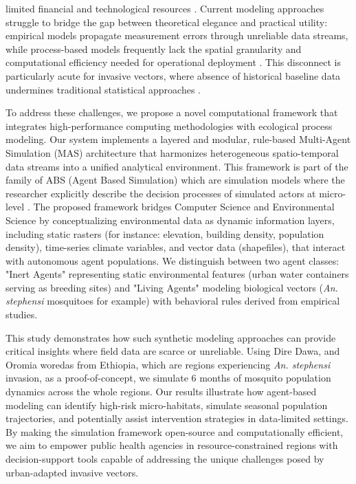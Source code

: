 \documentclass{article}
\begin{document}
limited financial and technological resources \citep{2025.RL.HMD}. Current modeling approaches struggle to bridge the gap between 
theoretical elegance and practical utility: empirical models propagate measurement errors through unreliable data streams, while 
process-based models frequently lack the spatial granularity and computational efficiency needed for operational 
deployment \citep{2025.RL.HMD}. This disconnect is particularly acute for invasive vectors, where absence of historical 
baseline data undermines traditional statistical approaches \citep{2019.EL.ALO}.
\par
To address these challenges, we propose a novel computational framework that integrates high-performance computing methodologies 
with ecological process modeling. Our system implements a layered and modular, rule-based Multi-Agent Simulation (MAS) architecture that 
harmonizes heterogeneous spatio-temporal data streams into a unified analytical environment. This framework is part of the 
family of ABS (Agent Based Simulation) which are simulation models where the researcher explicitly describe the decision 
processes of simulated actors at micro-level \citep{2008.PE.ITM}. The proposed framework bridges Computer Science and 
Environmental Science by conceptualizing environmental data as dynamic information layers, including static rasters (for instance: 
elevation, building density, population density), time-series climate variables, and vector data (shapefiles), that interact with 
autonomous agent populations. We distinguish between two agent classes: "Inert Agents" representing static environmental features 
(urban water containers serving as breeding sites) and "Living Agents" modeling biological vectors (\textit{An. stephensi} mosquitoes for 
example) with behavioral rules derived from empirical studies.
\par
This study demonstrates how such synthetic modeling approaches can provide critical insights where field data are scarce or 
unreliable. Using Dire Dawa, and Oromia woredas from Ethiopia, which are regions experiencing \textit{An. stephensi} invasion, 
\citep{2024.GZ.ROC,2023.DH.FRO} as a proof-of-concept, we simulate 6 months of mosquito population dynamics across the whole regions. 
Our results illustrate how agent-based modeling can identify high-risk micro-habitats, simulate seasonal population trajectories, and 
potentially assist intervention strategies in data-limited settings. By making the simulation framework open-source and computationally 
efficient, we aim to empower public health agencies in resource-constrained regions with decision-support tools capable of addressing the 
unique challenges posed by urban-adapted invasive vectors.
\end{document}
